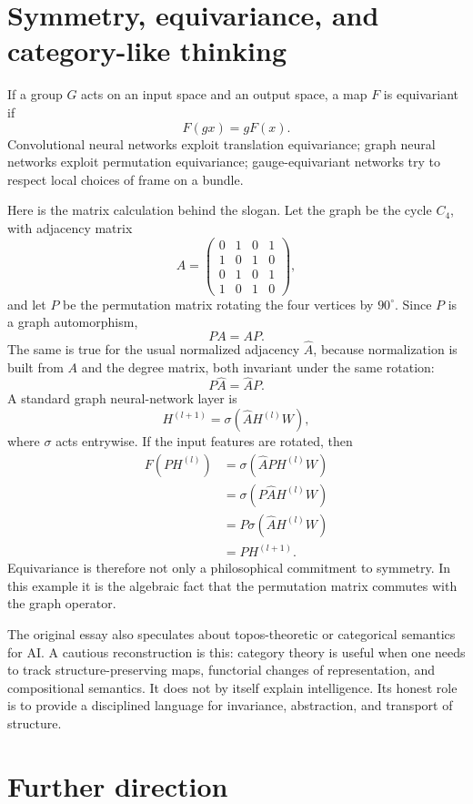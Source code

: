 \section{Symmetry, equivariance, and category-like thinking}

If a group $G$ acts on an input space and an output space, a map $F$ is equivariant if
\[
  F(gx)=gF(x).
\]
Convolutional neural networks exploit translation equivariance; graph neural networks exploit permutation equivariance; gauge-equivariant networks try to respect local choices of frame on a bundle.

Here is the matrix calculation behind the slogan.  Let the graph be the cycle \(C_4\), with adjacency matrix
\[
  A=
  \begin{pmatrix}
  0&1&0&1\\
  1&0&1&0\\
  0&1&0&1\\
  1&0&1&0
  \end{pmatrix},
\]
and let \(P\) be the permutation matrix rotating the four vertices by \(90^\circ\).  Since \(P\) is a graph automorphism,
\[
  PA=AP.
\]
The same is true for the usual normalized adjacency \(\widehat A\), because normalization is built from \(A\) and the degree matrix, both invariant under the same rotation:
\[
  P\widehat A=\widehat A P.
\]
A standard graph neural-network layer is
\[
  H^{(l+1)}=\sigma(\widehat A H^{(l)}W),
\]
where \(\sigma\) acts entrywise.  If the input features are rotated, then
\[
\begin{aligned}
  F(PH^{(l)})
  &=\sigma(\widehat A PH^{(l)}W)\\
  &=\sigma(P\widehat A H^{(l)}W)\\
  &=P\sigma(\widehat A H^{(l)}W)\\
  &=PH^{(l+1)}.
\end{aligned}
\]
Equivariance is therefore not only a philosophical commitment to symmetry.  In this example it is the algebraic fact that the permutation matrix commutes with the graph operator.

The original essay also speculates about topos-theoretic or categorical semantics for AI.  A cautious reconstruction is this: category theory is useful when one needs to track structure-preserving maps, functorial changes of representation, and compositional semantics.  It does not by itself explain intelligence.  Its honest role is to provide a disciplined language for invariance, abstraction, and transport of structure.

\section{Further direction}

